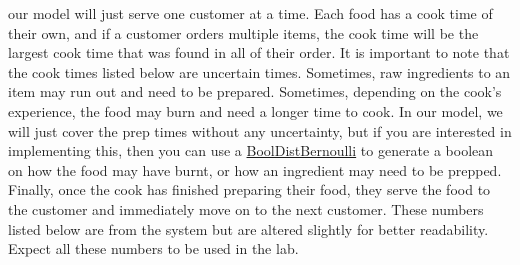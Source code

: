 \documentclass[11pt]{article}
\begin{document}
our model will just serve one customer at a time. Each food has a cook time of their own, and if a customer orders multiple items, the cook time will be the largest cook time that was found in all of their order.
\newline
It is important to note that the cook times listed below are uncertain times. Sometimes, raw ingredients to an item may run out and need to be prepared. Sometimes, depending on the cook's experience, the food may burn and need a longer time to cook.
In our model, we will just cover the prep times without any uncertainty, but if you are interested in implementing this, then you can use a \href{http://desmoj.sourceforge.net/doc/desmoj/core/dist/BoolDistBernoulli.html}{BoolDistBernoulli} to
generate a boolean on how the food may have burnt, or how an ingredient may need to be prepped.
\newline
Finally, once the cook has finished preparing their food, they serve the food to the customer and immediately move on to the next customer.
These numbers listed below are from the system but are altered slightly for better readability. Expect all these numbers to be used in the lab.
\end{document}
